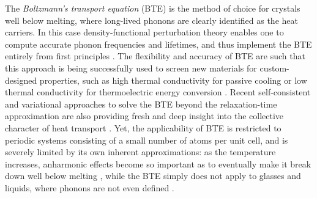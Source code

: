 The \emph{Boltzmann's transport equation} (BTE) \cite{Peierls1929,Zhou2016} is the method of choice for crystals well below melting, where long-lived phonons are clearly identified as the heat carriers. In this case density-functional perturbation theory \cite{Baroni1987a,Gonze1989,Baroni2001} enables one to compute accurate phonon frequencies \cite{Giannozzi1991} and lifetimes, \cite{Debernardi1995,Paulatto2013} and thus implement the BTE entirely from first principles \cite{Broido:2007iu}. 
The flexibility and accuracy of \abinitio BTE are such that this approach is being successfully used to screen new materials for custom-designed properties, such as high thermal conductivity for passive cooling \cite{Lindsay:2013fw,Lindsay:2013db} or low thermal conductivity for thermoelectric energy conversion \cite{PhysRevX.4.011019,Schwingen2014}. 
Recent self-consistent and variational approaches to solve the BTE beyond the relaxation-time approximation \cite{Fugallo2013} are also providing fresh and deep insight into the collective character of heat transport \cite{Fugallo2013,Lee:2015ex,Cepellotti2015,Cepellotti:2016bk}. 
Yet, the applicability of \abinitio BTE is restricted to periodic systems consisting of a small number of atoms per unit cell, and is severely limited by its own inherent approximations: as the temperature increases, anharmonic effects become so important as to eventually make it break down well below melting \cite{Turney:2009bb}, while the BTE simply does not apply to glasses and liquids, where phonons are not even defined \cite{Allen1989} . 

